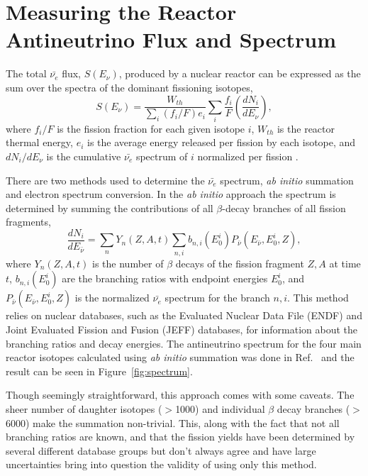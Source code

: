 \section{Measuring the Reactor Antineutrino Flux and Spectrum}

The total $\bar{\nu_{e}}$ flux, $S(E_\nu)$, produced by a nuclear reactor can be expressed as the sum over the spectra of the dominant fissioning isotopes,
\begin{equation}
	S(E_\nu) = \frac{W_{th}}{\sum_{i}(f_i/F)e_i}\sum_{i}\frac{f_i}{F}\left(\frac{dN_i}{dE_\nu}\right) ,
\end{equation}
where $f_i/F$ is the fission fraction for each given isotope $i$, $W_{th}$ is the reactor thermal energy, $e_i$ is the 
average energy released per fission by each isotope, and $dN_i/dE_\nu$ is the cumulative $\bar{\nu_e}$ spectrum of $i$ normalized per fission \cite{HayesVogel}.

There are two methods used to determine the $\bar{\nu_e}$ spectrum, \textit{ab initio} summation and electron spectrum conversion.
In the \textit{ab initio} approach the spectrum is determined by summing the contributions of all $\beta$-decay branches of all fission fragments,
\begin{equation}
	\frac{dN_i}{dE_{\bar{\nu}}} =  \sum_{n}Y_n(Z,A,t)\sum_{n,i}b_{n,i}(E^i_0)P_{\bar{\nu}}(E_{\bar{\nu}},E^i_0,Z) ,
\end{equation}
where $Y_n(Z,A,t)$ is the number of $\beta$ decays of the fission fragment $Z, A$ at time $t$, $b_{n,i}(E^i_0)$ are the branching ratios with endpoint energies $E^i_0$, and $P_{\bar{\nu}}(E_{\bar{\nu}},E^i_0,Z)$ is the normalized $\bar{\nu_e}$ spectrum for the branch $n, i$.
This method relies on nuclear databases, such as the Evaluated Nuclear Data File (ENDF) \cite{ENDF} and Joint Evaluated Fission and Fusion (JEFF) \cite{JEFF} databases, for information about the branching ratios and decay energies. 
The antineutrino spectrum for the four main reactor isotopes calculated using \textit{ab initio} summation was done in Ref.~\cite{HayesVogel} and the result can be seen in Figure~\ref{fig:spectrum}. 

Though seemingly straightforward, this approach comes with some caveats.
The sheer number of daughter isotopes ($>$1000) and individual $\beta$ decay branches ($>$6000) make the summation non-trivial.
This, along with the fact that not all branching ratios are known, and that the fission yields have been determined by several different database groups but don't always agree and have large uncertainties bring into question the validity of using only this method. 

